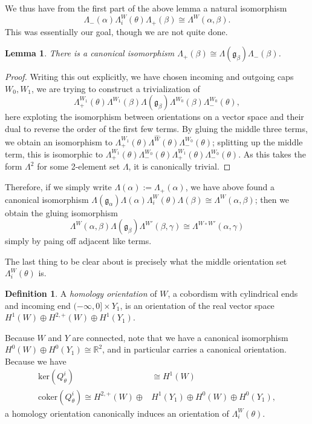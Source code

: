 \documentclass[10pt,a4paper]{amsart}
\newtheorem{lemma}[theorem]{Lemma}
\theoremstyle{definition}
\newtheorem{definition}[theorem]{Definition}
\theoremstyle{remark}
\numberwithin{figure}{qchap}
\begin{document}
We thus have from the first part of the above lemma a natural isomorphism $$\Lambda_-(\alpha) \Lambda^W_i(\theta) \Lambda_+(\beta) \cong \Lambda^W(\alpha, \beta).$$ This was essentially our goal, though we are not quite done.

\begin{lemma}There is a canonical isomorphism $\Lambda_+(\beta) \cong \Lambda(\mathfrak g_\beta)\Lambda_-(\beta)$.
\end{lemma}
\begin{proof}Writing this out explicitly, we have chosen incoming and outgoing caps $W_0, W_1$, we are trying to construct a trivialization of $$\Lambda^{W_1}_+(\theta)\Lambda^{W_1}(\beta) \Lambda(\mathfrak g_\beta) \Lambda^{W_0}(\beta) \Lambda^{W_0}_-(\theta),$$ here exploting the isomorphism between orientations on a vector space and their dual to reverse the order of the first few terms. By gluing the middle three terms, we obtain an isomorphism to $\Lambda^{W_1}_+(\theta) \Lambda^{\hat W}(\theta) \Lambda^{W_0}_-(\theta)$; splitting up the middle term, this is isomorphic to $\Lambda^{W_1}_+(\theta) \Lambda^{W_0}_-(\theta) \Lambda^{W_1}_+(\theta) \Lambda^{W_0}_-(\theta)$. As this takes the form $\Lambda^2$ for some 2-element set $\Lambda$, it is canonically trivial.
\end{proof}

Therefore, if we simply write $\Lambda(\alpha) := \Lambda_+(\alpha)$, we have above found a canonical isomorphism $\Lambda(\mathfrak g_\alpha)\Lambda(\alpha) \Lambda^W_i(\theta) \Lambda(\beta) \cong \Lambda^W(\alpha, \beta)$; then we obtain the gluing isomorphism 
$$\Lambda^W(\alpha, \beta) \Lambda(\mathfrak g_\beta) \Lambda^{W'}(\beta, \gamma) \cong \Lambda^{W \circ W'}(\alpha, \gamma)$$ 
simply by paing off adjacent like terms.

The last thing to be clear about is precisely what the middle orientation set $\Lambda^W_i(\theta)$ is.

\begin{definition}\label{homology-or}A \emph{homology orientation} of $W$, a cobordism with cylindrical ends and incoming end $(-\infty, 0] \times Y_1$, is an orientation of the real vector space $H^1(W) \oplus H^{2,+}(W) \oplus H^1(Y_1)$.
\end{definition}
Because $W$ and $Y$ are connected, note that we have a canonical isomorphism $H^0(W) \oplus H^0(Y_1) \cong \mathbb R^2$, and in particular carries a canonical orientation. Because we have 
\begin{align*}\text{ker}(Q^i_\theta) &\cong H^1(W)\\
\text{coker}(Q^i_\theta) \cong H^{2,+}(W) \oplus &H^1(Y_1) \oplus H^0(W) \oplus H^0(Y_1),\end{align*}
a homology orientation canonically induces an orientation of $\Lambda^W_i(\theta)$.
\end{document}
